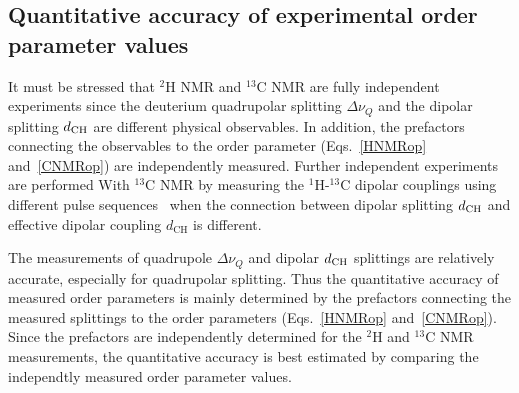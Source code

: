 \documentclass[aps,prl,superscriptaddress,twocolumn]{revtex4}
\begin{document}
\subsection{Quantitative accuracy of experimental order parameter values}\label{QUANTaccuracySECTION}

It must be stressed that $^2$H NMR and $^{13}$C NMR are fully independent experiments since the deuterium quadrupolar splitting $\Delta \nu_Q$
and the dipolar splitting $d_{{\rm CH}}$ are different physical observables. In addition, the prefactors connecting the observables to the order 
parameter (Eqs.~\ref{HNMRop} and~\ref{CNMRop}) are independently measured. Further independent experiments are performed With $^{13}$C NMR 
by measuring the $^1$H-$^{13}$C dipolar couplings using different pulse sequences~\cite{hong95a,gross97,dvinskikh05a,ferreira13} when the connection
between dipolar splitting $d_{{\rm CH}}$ and effective dipolar coupling $d_\mathrm{CH}$ is different.

The measurements of quadrupole $\Delta \nu_Q$ and dipolar $d_{{\rm CH}}$ splittings are relatively accurate, especially for quadrupolar splitting.
Thus the quantitative accuracy of measured order parameters is mainly determined by the  
prefactors connecting the measured splittings to the order parameters (Eqs.~\ref{HNMRop} and~\ref{CNMRop}). 
Since the prefactors are independently determined for the $^2$H and $^{13}$C NMR measurements,
the quantitative accuracy is best estimated by comparing the independtly measured order parameter values.
\end{document}
